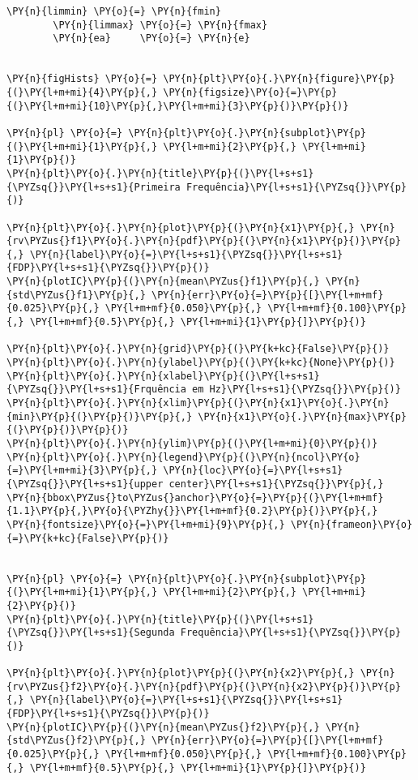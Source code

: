 \begin{tcolorbox}[breakable, size=fbox, boxrule=1pt, pad at break*=1mm,colback=cellbackground, colframe=cellborder]
\begin{Verbatim}[commandchars=\\\{\}]
        \PY{n}{limmin} \PY{o}{=} \PY{n}{fmin}
        \PY{n}{limmax} \PY{o}{=} \PY{n}{fmax}
        \PY{n}{ea}     \PY{o}{=} \PY{n}{e}
        

\PY{n}{figHists} \PY{o}{=} \PY{n}{plt}\PY{o}{.}\PY{n}{figure}\PY{p}{(}\PY{l+m+mi}{4}\PY{p}{,} \PY{n}{figsize}\PY{o}{=}\PY{p}{(}\PY{l+m+mi}{10}\PY{p}{,}\PY{l+m+mi}{3}\PY{p}{)}\PY{p}{)}

\PY{n}{pl} \PY{o}{=} \PY{n}{plt}\PY{o}{.}\PY{n}{subplot}\PY{p}{(}\PY{l+m+mi}{1}\PY{p}{,} \PY{l+m+mi}{2}\PY{p}{,} \PY{l+m+mi}{1}\PY{p}{)}
\PY{n}{plt}\PY{o}{.}\PY{n}{title}\PY{p}{(}\PY{l+s+s1}{\PYZsq{}}\PY{l+s+s1}{Primeira Frequência}\PY{l+s+s1}{\PYZsq{}}\PY{p}{)}

\PY{n}{plt}\PY{o}{.}\PY{n}{plot}\PY{p}{(}\PY{n}{x1}\PY{p}{,} \PY{n}{rv\PYZus{}f1}\PY{o}{.}\PY{n}{pdf}\PY{p}{(}\PY{n}{x1}\PY{p}{)}\PY{p}{,} \PY{n}{label}\PY{o}{=}\PY{l+s+s1}{\PYZsq{}}\PY{l+s+s1}{FDP}\PY{l+s+s1}{\PYZsq{}}\PY{p}{)}
\PY{n}{plotIC}\PY{p}{(}\PY{n}{mean\PYZus{}f1}\PY{p}{,} \PY{n}{std\PYZus{}f1}\PY{p}{,} \PY{n}{err}\PY{o}{=}\PY{p}{[}\PY{l+m+mf}{0.025}\PY{p}{,} \PY{l+m+mf}{0.050}\PY{p}{,} \PY{l+m+mf}{0.100}\PY{p}{,} \PY{l+m+mf}{0.5}\PY{p}{,} \PY{l+m+mi}{1}\PY{p}{]}\PY{p}{)}

\PY{n}{plt}\PY{o}{.}\PY{n}{grid}\PY{p}{(}\PY{k+kc}{False}\PY{p}{)}
\PY{n}{plt}\PY{o}{.}\PY{n}{ylabel}\PY{p}{(}\PY{k+kc}{None}\PY{p}{)}
\PY{n}{plt}\PY{o}{.}\PY{n}{xlabel}\PY{p}{(}\PY{l+s+s1}{\PYZsq{}}\PY{l+s+s1}{Frquência em Hz}\PY{l+s+s1}{\PYZsq{}}\PY{p}{)}
\PY{n}{plt}\PY{o}{.}\PY{n}{xlim}\PY{p}{(}\PY{n}{x1}\PY{o}{.}\PY{n}{min}\PY{p}{(}\PY{p}{)}\PY{p}{,} \PY{n}{x1}\PY{o}{.}\PY{n}{max}\PY{p}{(}\PY{p}{)}\PY{p}{)}
\PY{n}{plt}\PY{o}{.}\PY{n}{ylim}\PY{p}{(}\PY{l+m+mi}{0}\PY{p}{)}
\PY{n}{plt}\PY{o}{.}\PY{n}{legend}\PY{p}{(}\PY{n}{ncol}\PY{o}{=}\PY{l+m+mi}{3}\PY{p}{,} \PY{n}{loc}\PY{o}{=}\PY{l+s+s1}{\PYZsq{}}\PY{l+s+s1}{upper center}\PY{l+s+s1}{\PYZsq{}}\PY{p}{,} \PY{n}{bbox\PYZus{}to\PYZus{}anchor}\PY{o}{=}\PY{p}{(}\PY{l+m+mf}{1.1}\PY{p}{,}\PY{o}{\PYZhy{}}\PY{l+m+mf}{0.2}\PY{p}{)}\PY{p}{,} \PY{n}{fontsize}\PY{o}{=}\PY{l+m+mi}{9}\PY{p}{,} \PY{n}{frameon}\PY{o}{=}\PY{k+kc}{False}\PY{p}{)}


\PY{n}{pl} \PY{o}{=} \PY{n}{plt}\PY{o}{.}\PY{n}{subplot}\PY{p}{(}\PY{l+m+mi}{1}\PY{p}{,} \PY{l+m+mi}{2}\PY{p}{,} \PY{l+m+mi}{2}\PY{p}{)}
\PY{n}{plt}\PY{o}{.}\PY{n}{title}\PY{p}{(}\PY{l+s+s1}{\PYZsq{}}\PY{l+s+s1}{Segunda Frequência}\PY{l+s+s1}{\PYZsq{}}\PY{p}{)}

\PY{n}{plt}\PY{o}{.}\PY{n}{plot}\PY{p}{(}\PY{n}{x2}\PY{p}{,} \PY{n}{rv\PYZus{}f2}\PY{o}{.}\PY{n}{pdf}\PY{p}{(}\PY{n}{x2}\PY{p}{)}\PY{p}{,} \PY{n}{label}\PY{o}{=}\PY{l+s+s1}{\PYZsq{}}\PY{l+s+s1}{FDP}\PY{l+s+s1}{\PYZsq{}}\PY{p}{)}
\PY{n}{plotIC}\PY{p}{(}\PY{n}{mean\PYZus{}f2}\PY{p}{,} \PY{n}{std\PYZus{}f2}\PY{p}{,} \PY{n}{err}\PY{o}{=}\PY{p}{[}\PY{l+m+mf}{0.025}\PY{p}{,} \PY{l+m+mf}{0.050}\PY{p}{,} \PY{l+m+mf}{0.100}\PY{p}{,} \PY{l+m+mf}{0.5}\PY{p}{,} \PY{l+m+mi}{1}\PY{p}{]}\PY{p}{)}


\end{Verbatim}
\end{tcolorbox}

